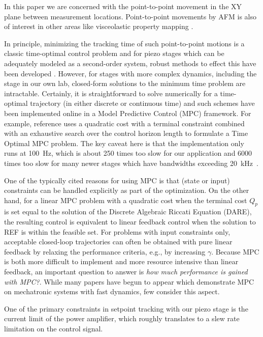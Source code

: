 \documentclass[journal,twocolumn,twoside]{IEEEtran}
\begin{document}
In this paper we are concerned with the point-to-point movement in the XY plane between measurement locations. 
Point-to-point movements by AFM is also of interest in other areas like visceolastic property mapping \cite{killgore_visceolastic_2011}.

In principle, minimizing the tracking time of such point-to-point motions is a classic time-optimal control problem and for piezo stages which can be adequately modeled as a second-order system, robust methods to effect this have been developed \cite{braker_proximate_2017}. However, for stages with more complex dynamics, including the stage in our own lab, closed-form solutions to the minimum time problem are intractable. Certainly, it is straightforward to solve numerically for a time-optimal trajectory (in either discrete or continuous time) and such schemes have been implemented online in a Model Predictive Control (MPC) framework. For example, reference \cite{broeck_time_2009} uses a quadratic cost with a terminal constraint combined with an exhaustive search over the control horizon length to formulate a Time Optimal MPC problem. The key caveat here is that the implementation only runs at 100~Hz, which is about 250 times too slow for our application and 6000 times too slow for many newer stages which have bandwidths exceeding 20~kHz~\cite{kenton_threeaxis}.


One of the typically cited reasons for using MPC is that (state or input) constraints can be handled explicitly as part of the optimization. On the other hand, for a linear MPC problem with a quadratic cost when the terminal cost $Q_p$ is set equal to the solution of the Discrete Algebraic Riccati Equation (DARE), the resulting control is equivalent to linear feedback control when the solution to REF is within the feasible set. For problems with input constraints only, acceptable closed-loop trajectories can often be obtained with pure linear feedback by relaxing the performance criteria, e.g., by increasing $\gamma$. Because MPC is both more difficult to implement and more resource intensive than linear feedback, an important question to answer is \emph{how much performance is gained with MPC?}. While many papers have begun to appear which demonstrate MPC on mechatronic systems with fast dynamics, few consider this aspect.

One of the primary constraints in setpoint tracking with our piezo stage is the current limit of the power amplifier,  which roughly translates to a slew rate limitation on the control signal. 
\end{document}
